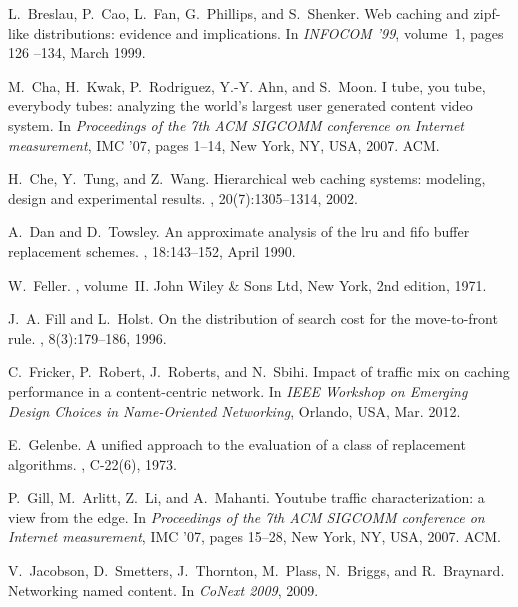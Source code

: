 \documentclass{amsart}
\begin{document}
\begin{thebibliography}{10}

L.~Breslau, P.~Cao, L.~Fan, G.~Phillips, and S.~Shenker.
\newblock Web caching and zipf-like distributions: evidence and implications.
\newblock In {\em INFOCOM '99}, volume~1, pages 126 --134, March 1999.

M.~Cha, H.~Kwak, P.~Rodriguez, Y.-Y. Ahn, and S.~Moon.
\newblock I tube, you tube, everybody tubes: analyzing the world's largest user
  generated content video system.
\newblock In {\em Proceedings of the 7th ACM SIGCOMM conference on Internet
  measurement}, IMC '07, pages 1--14, New York, NY, USA, 2007. ACM.

H.~Che, Y.~Tung, and Z.~Wang.
\newblock Hierarchical web caching systems: modeling, design and experimental
  results.
, 20(7):1305--1314, 2002.

A.~Dan and D.~Towsley.
\newblock An approximate analysis of the lru and fifo buffer replacement
  schemes.
, 18:143--152, April 1990.

W.~Feller.
,
  volume~{II}.
\newblock John Wiley \& Sons Ltd, New York, 2nd edition, 1971.

J.~A. Fill and L.~Holst.
\newblock On the distribution of search cost for the move-to-front rule.
, 8(3):179--186, 1996.

C.~Fricker, P.~Robert, J.~Roberts, and N.~Sbihi.
\newblock Impact of traffic mix on caching performance in a content-centric
  network.
\newblock In {\em {IEEE} Workshop on Emerging Design Choices in Name-Oriented
  Networking}, Orlando, USA, Mar. 2012.

E.~Gelenbe.
\newblock A unified approach to the evaluation of a class of replacement
  algorithms.
, C-22(6), 1973.

P.~Gill, M.~Arlitt, Z.~Li, and A.~Mahanti.
\newblock Youtube traffic characterization: a view from the edge.
\newblock In {\em Proceedings of the 7th ACM SIGCOMM conference on Internet
  measurement}, IMC '07, pages 15--28, New York, NY, USA, 2007. ACM.

V.~Jacobson, D.~Smetters, J.~Thornton, M.~Plass, N.~Briggs, and R.~Braynard.
\newblock Networking named content.
\newblock In {\em {CoNext 2009}}, 2009.


\end{thebibliography}
\end{document}
